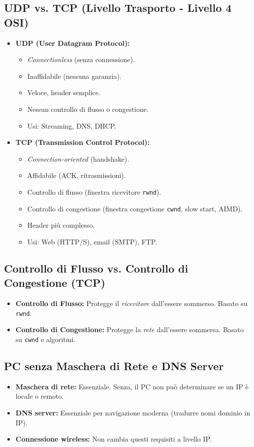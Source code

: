 \documentclass{article}
\begin{document}
\subsection{UDP vs. TCP (Livello Trasporto - Livello 4 OSI)}
\begin{itemize}
    \item \textbf{UDP (User Datagram Protocol):}
    \begin{itemize}
        \item \textit{Connectionless} (senza connessione).
        \item Inaffidabile (nessuna garanzia).
        \item Veloce, header semplice.
        \item Nessun controllo di flusso o congestione.
        \item Usi: Streaming, DNS, DHCP.
    \end{itemize}
    \item \textbf{TCP (Transmission Control Protocol):}
    \begin{itemize}
        \item \textit{Connection-oriented} (handshake).
        \item Affidabile (ACK, ritrasmissioni).
        \item Controllo di flusso (finestra ricevitore \texttt{rwnd}).
        \item Controllo di congestione (finestra congestione \texttt{cwnd}, slow start, AIMD).
        \item Header più complesso.
        \item Usi: Web (HTTP/S), email (SMTP), FTP.
    \end{itemize}
\end{itemize}

\subsection{Controllo di Flusso vs. Controllo di Congestione (TCP)}
\begin{itemize}
    \item \textbf{Controllo di Flusso:} Protegge il \textit{ricevitore} dall'essere sommerso. Basato su \texttt{rwnd}.
    \item \textbf{Controllo di Congestione:} Protegge la \textit{rete} dall'essere sommersa. Basato su \texttt{cwnd} e algoritmi.
\end{itemize}

\subsection{PC senza Maschera di Rete e DNS Server}
\begin{itemize}
    \item \textbf{Maschera di rete:} Essenziale. Senza, il PC non può determinare se un IP è locale o remoto.
    \item \textbf{DNS server:} Essenziale per navigazione moderna (tradurre nomi dominio in IP).
    \item \textbf{Connessione wireless:} Non cambia questi requisiti a livello IP.
\end{itemize}
\end{document}
